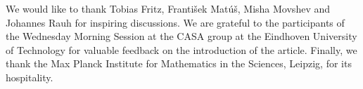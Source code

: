 We would like to thank Tobias Fritz, Franti{\v s}ek Mat{\' u}{\v s}, Misha Movshev and Johannes Rauh for inspiring discussions. We are grateful to the participants of the Wednesday Morning Session at the CASA group at the Eindhoven University of Technology for valuable feedback on the introduction of the article.
Finally, we thank the Max Planck Institute for Mathematics in the Sciences, Leipzig, for its hospitality.